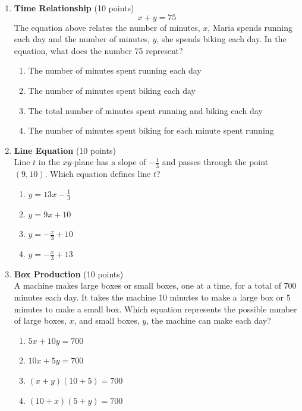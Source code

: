 \begin{enumerate}
  \item \textbf{Time Relationship} (10 points)\\
  $$x+y=75$$
  The equation above relates the number of minutes, $x$, Maria spends running each day and the number of minutes, $y$, she spends biking each day. In the equation, what does the number 75 represent?\\
  \begin{enumerate}[label=(\Alph*)]
    \item The number of minutes spent running each day
    \item The number of minutes spent biking each day
    \item The total number of minutes spent running and biking each day
    \item The number of minutes spent biking for each minute spent running
  \end{enumerate}
  \begin{subanswer}
  \end{subanswer}

  \newpage

  \item \textbf{Line Equation} (10 points)\\
  Line $t$ in the $xy$-plane has a slope of $-\frac{1}{3}$ and passes through the point $(9,10)$. Which equation defines line $t$?\\
  \begin{enumerate}[label=(\Alph*)]
    \item $y=13x-\frac{1}{3}$
    \item $y=9x+10$
    \item $y=-\frac{x}{3}+10$
    \item $y=-\frac{x}{3}+13$
  \end{enumerate}
  \begin{subanswer}
  \end{subanswer}

  \item \textbf{Box Production} (10 points)\\
  A machine makes large boxes or small boxes, one at a time, for a total of 700 minutes each day. It takes the machine 10 minutes to make a large box or 5 minutes to make a small box. Which equation represents the possible number of large boxes, $x$, and small boxes, $y$, the machine can make each day?\\
  \begin{enumerate}[label=(\Alph*)]
    \item $5x+10y=700$
    \item $10x+5y=700$
    \item $(x+y)(10+5)=700$
    \item $(10+x)(5+y)=700$
  \end{enumerate}
  \begin{subanswer}
  \end{subanswer}


\end{enumerate}
